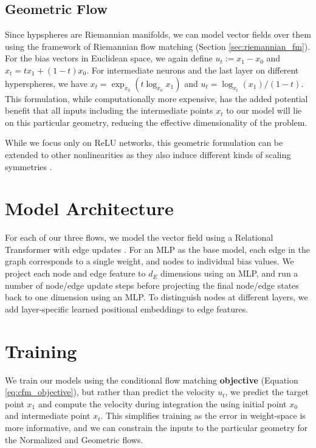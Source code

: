 \subsection{Geometric Flow}

Since hypspheres are Riemannian manifolds, we can model vector fields over them using the framework of Riemannian flow matching \citep{chenRiemannianFlowMatching2023} (Section \ref{sec:riemannian_fm}). For the bias vectors in Euclidean space, we again define $u_t := x_1 - x_0$ and $x_t = t x_1 + (1-t) x_0$. For intermediate neurons and the last layer on different hyperspheres, we have $x_t = \exp_{x_0}(t \log_{x_0}x_1)$ and $u_t = \log_{x_t}(x_1) / (1-t)$. This formulation, while computationally more expensive, has the added potential benefit that all inputs including the intermediate points $x_t$ to our model will lie on this particular geometry, reducing the effective dimensionality of the problem. 

While we focus only on ReLU networks, this geometric formulation can be extended to other nonlinearities as they also induce different kinds of scaling symmetries \citep{godfreySymmetriesDeepLearning2022}. 

\section{Model Architecture}

For each of our three flows, we model the vector field using a Relational Transformer with edge updates \citep{diaoRelationalAttentionGeneralizing2023,kofinasGraphNeuralNetworks2024}. For an MLP as the base model, each edge in the graph corresponds to a single weight, and nodes to individual bias values. We project each node and edge feature to $d_E$ dimensions using an MLP, and run a number of node/edge update steps before projecting the final node/edge states back to one dimension using an MLP. To distinguish nodes at different layers, we add layer-specific learned positional embeddings to edge features. 

\section{Training}

We train our models using the conditional flow matching \textbf{objective} (Equation \ref{eq:cfm_objective}), but rather than predict the velocity $u_t$, we predict the target point $x_1$ and compute the velocity during integration the using initial point $x_0$ and intermediate point $x_t$. This simplifies training as the error in weight-space is more informative, and we can constrain the inputs to the particular geometry for the Normalized and Geometric flows. 

